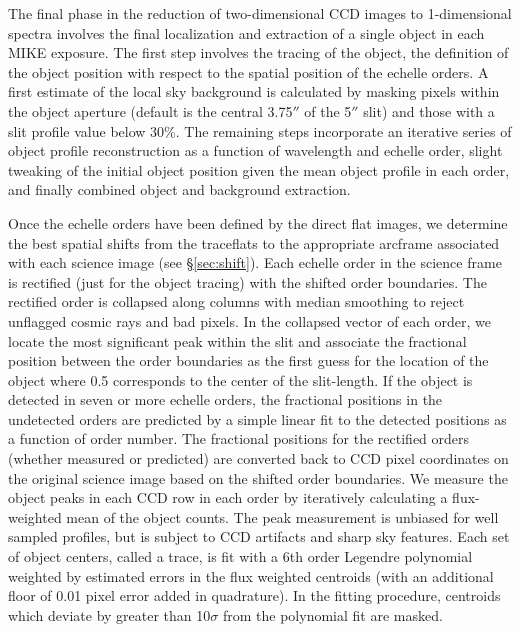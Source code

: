 \documentclass[12pt,preprint]{aastex}
\begin{document}
The final phase in the reduction of two-dimensional CCD images
to 1-dimensional spectra involves the final localization and extraction
of a single object in each MIKE exposure.  The first step involves the tracing
of the object, the definition of the object position with respect to
the spatial position of the echelle orders.  
A first estimate of the local sky background is 
calculated by masking pixels within the object aperture 
(default is the central 3.75$''$ of the 5$''$ slit) and those with
a slit profile value below 30\%.
The remaining steps incorporate an iterative series of 
object profile reconstruction as a function of wavelength and echelle order, 
slight tweaking of the initial object position given the mean 
object profile in each order, and finally combined object and background
extraction.

Once the echelle orders have been defined by the direct flat images, we determine
the best spatial shifts from the traceflats to the appropriate arcframe
associated with each science image (see \S\ref{sec:shift}).  
Each echelle order in the science frame
is rectified (just for the object tracing) with the shifted order boundaries.
The rectified order is collapsed along columns with median smoothing to reject
unflagged cosmic rays and bad pixels.  In the collapsed vector of each order, 
we locate the most significant peak within the slit
and associate the fractional position 
between the order boundaries as the first guess for the location of 
the object where 0.5 corresponds to the center of the slit-length.
If the object is detected in seven or more echelle
orders, the fractional positions in the undetected orders 
are predicted by a simple linear fit to the detected positions
as a function of order number.  The fractional positions 
for the rectified orders (whether measured
or predicted) are converted back to CCD pixel coordinates on the original 
science image based on the shifted order boundaries.  We measure the object 
peaks in each CCD row in each order by iteratively calculating a flux-weighted
mean of the object counts.  The peak measurement is unbiased for well sampled
profiles, but is subject to CCD artifacts and sharp sky features.  Each
set of object centers, called a trace, 
is fit with a 6th order Legendre polynomial
weighted by estimated errors in the flux weighted centroids (with an additional
floor of 0.01 pixel error added in quadrature).  In the fitting procedure,
centroids which deviate by greater than 10$\sigma$ from the polynomial fit
are masked.  
\end{document}
